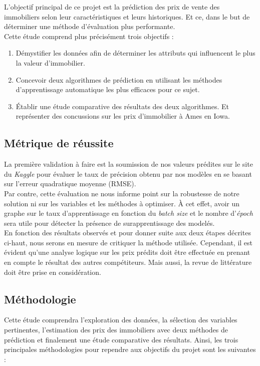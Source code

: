\documentclass[12pt]{extarticle}
\begin{document}
L’objectif principal de ce projet est la prédiction des prix de vente des immobiliers selon leur caractéristiques et leurs historiques. Et ce, dans le but de déterminer une méthode d’évaluation plus performante. \\
Cette étude comprend plus précisément trois objectifs :
\renewcommand{\labelenumii}{\Roman{enumii}}
 \begin{enumerate}
   \item Démystifier les données afin de déterminer les attributs qui influencent le plus la valeur d’immobilier.
   \item Concevoir deux algorithmes de prédiction en utilisant les méthodes d’apprentissage automatique les plus efficaces pour ce sujet.
   \item Établir une étude comparative des résultats des deux algorithmes. Et représenter des concussions sur les prix d’immobilier à Ames en Iowa.
 \end{enumerate}

\subsection{Métrique de réussite}
 
La première validation à faire est la soumission de nos valeurs prédites sur le site du \emph{Kaggle} pour évaluer le taux de précision obtenu par nos modèles en se basant sur l’erreur quadratique moyenne (RMSE). \\
Par contre, cette évaluation ne nous informe point sur la robustesse de notre solution ni sur les variables et les méthodes à optimiser. À cet effet, avoir un graphe sur le taux d’apprentissage en fonction du \emph{batch size} et le nombre d’\emph{époch} sera utile pour détecter la présence de surapprentissage des modelés. \\
En fonction des résultats observés et pour donner suite aux deux étapes décrites ci-haut, nous serons en mesure de critiquer la méthode utilisée. Cependant, il est évident qu’une analyse logique sur les prix prédits doit être effectuée en prenant en compte le résultat des autres compétiteurs. Mais aussi, la revue de littérature doit être prise en considération.\\

\subsection{Méthodologie}
Cette étude comprendra l’exploration des données, la sélection des variables pertinentes, l’estimation des prix des immobiliers avec deux méthodes de prédiction et finalement une étude comparative des résultats. Ainsi, les trois principales méthodologies pour rependre aux objectifs du projet sont les suivantes :\\
\end{document}
